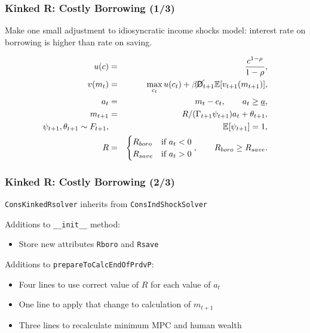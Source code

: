 \documentclass{beamer}
\newcommand{\Ex}{\mathbb{E}}
\newcommand{\PDies}{\mathsf{D}}
\newcommand{\PLives}{\cancel{\PDies}}
\begin{document}
\begin{frame}
  \frametitle{Kinked R: Costly Borrowing (1/3)}
  Make one small adjustment to idiosyncratic income shocks model: interest rate on borrowing is higher than rate on saving.

  \begin{eqnarray*}
    u(c) &=& \frac{c^{1-\rho}}{1-\rho}, \\
    v(m_t) &=& \max_{c_t} u(c_t) + \beta \PLives_{t+1} \Ex [v_{t+1}(m_{t+1}) ], \\
    a_t &=& m_t - c_t, \qquad a_t \geq \underline{a}, \\
    m_{t+1} &=& R/(\Gamma_{t+1} \psi_{t+1}) a_t + \theta_{t+1}, \\
   \psi_{t+1},\theta_{t+1} \sim F_{t+1}, & & \Ex[\psi_{t+1}] = 1, \\
    R &=& \begin{cases}
      R_{boro} & \text{if  } a_t < 0 \\
      R_{save} & \text{if  } a_t > 0
    \end{cases}, \qquad R_{boro} \geq R_{save}.
  \end{eqnarray*}
\end{frame}


\begin{frame}
  \frametitle{Kinked R: Costly Borrowing (2/3)}
  \texttt{ConsKinkedRsolver} inherits from \texttt{ConsIndShockSolver}

  \begin{block}{Additions to \texttt{\_\_init\_\_} method:}
    \begin{itemize}
    \item Store new attributes \texttt{Rboro} and \texttt{Rsave}
    \end{itemize}
  \end{block}
  \begin{block}{Additions to \texttt{prepareToCalcEndOfPrdvP}:}
    \begin{itemize}
    \item Four lines to use correct value of $R$ for each value of $a_t$

    \item One line to apply that change to calculation of $m_{t+1}$

    \item Three lines to recalculate minimum MPC and human wealth
    \end{itemize}
  \end{block}
\end{frame}
\end{document}
